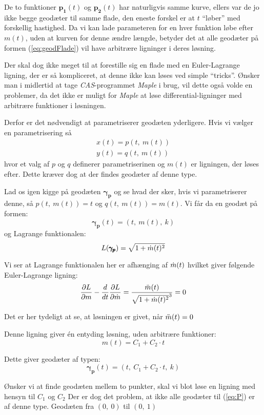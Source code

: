 De to funktioner \(\pmb{p_1}(t)\) og \(\pmb{p_2}(t)\) har naturligvis samme kurve,
ellers var de jo ikke begge geodæter til samme flade, den eneste forskel er at \(t\) ``løber'' med forskellig hastighed.
Da vi kan lade parameteren for en hver funktion løbe efter \(m(t)\), uden at kurven for denne ændre længde,
betyder det at alle geodæter på formen (\ref{eq:geodFlade}) vil have arbitrære ligninger i deres løsning.

Der skal dog ikke meget til at forestille sig en flade med en Euler-Lagrange ligning, der er så kompliceret,
at denne ikke kan løses ved simple ``tricks''. Ønsker man i midlertid at tage \emph{CAS}-programmet \emph{Maple}
i brug, vil dette også volde en problemer,
da det ikke er muligt for \emph{Maple} at løse differential-ligninger med arbitrære funktioner i løsningen.

Derfor er det nødvendigt at parametriserer geodæten yderligere. Hvis vi vælger en parametrisering så
\begin{gather*}
x(t) = p(t,~m(t))\\
y(t) = q(t,~m(t))
\end{gather*}
hvor et valg af \(p\) og \(q\) definerer parametriserinen og \(m(t)\) er ligningen, der løses efter.
Dette kræver dog at der findes geodæter af denne type.

Lad os igen kigge på geodæten \(\pmb{\gamma_p}\) og se hvad der sker, hvis vi parametriserer denne,
så \(p(t,~m(t) ) = t\) og \(q(t,~m(t) ) = m(t)\).
Vi får da en geodæt på formen:
\begin{equation*}
\pmb{\gamma_p}(t) = (t,~m(t),~k)
\end{equation*}
%
og Lagrange funktionalen:
\begin{equation*}
L(\pmb{\gamma_p}) = \sqrt{ 1 + \dot{m}(t)^2 }
\end{equation*}

Vi ser at Lagrange funktionalen her er afhænging af \(\dot{m}(t)\) 
hvilket giver følgende Euler-Lagrange ligning:
\begin{equation*}
\frac{\partial L}{\partial m} - \frac{d}{d t} \frac{\partial L}{\partial \dot{m}} = 
\frac{\ddot{m}(t)}{\sqrt{1 + \dot{m}(t)^2}^3} = 0\\
\end{equation*}

Det er her tydeligt at se, at løsningen er givet, når \(\ddot{m}(t) = 0\)

Denne ligning giver én entyding løsning, uden arbitrære funktioner:
\begin{equation*}
m(t) = C_1 + C_2 \cdot t
\end{equation*}

Dette giver geodæter af typen:
\begin{equation*}
\pmb{\gamma_p}(t) = (t,~C_1 + C_2 \cdot t,~k)
\end{equation*}
 
 Ønsker vi at finde geodæten mellem to punkter, skal vi blot løse en ligning med hensyn til \(C_1\) og \(C_2\)
 Der er dog det problem, at ikke alle geodæter til (\ref{eq:P}) er af denne type. Geodæten fra \((0,~0)\) til \((0,~1)\)


